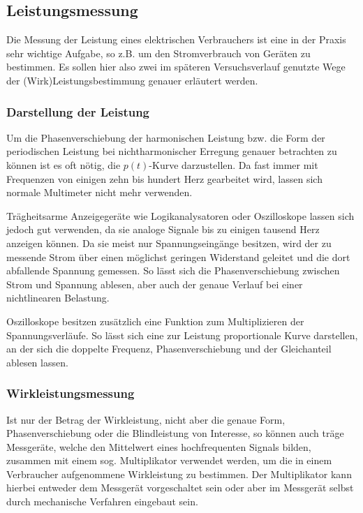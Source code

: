 \subsection{Leistungsmessung}
Die Messung der Leistung eines elektrischen Verbrauchers ist eine in der Praxis sehr wichtige Aufgabe, so z.B. um den Stromverbrauch von Geräten zu bestimmen. Es sollen hier also zwei im späteren Versuchsverlauf genutzte Wege der (Wirk)Leistungsbestimmung genauer erläutert werden.

\subsubsection{Darstellung der Leistung}
Um die Phasenverschiebung der harmonischen Leistung bzw. die Form der periodischen Leistung bei nichtharmonischer Erregung genauer betrachten zu können ist es oft nötig, die $p(t)$-Kurve darzustellen. Da fast immer mit Frequenzen von einigen zehn bis hundert Herz gearbeitet wird, lassen sich normale Multimeter nicht mehr verwenden.

Trägheitsarme Anzeigegeräte wie Logikanalysatoren oder Oszilloskope lassen sich jedoch gut verwenden, da sie analoge Signale bis zu einigen tausend Herz anzeigen können. Da sie meist nur Spannungseingänge besitzen, wird der zu messende Strom über einen möglichst geringen Widerstand geleitet und die dort abfallende Spannung gemessen. So lässt sich die Phasenverschiebung zwischen Strom und Spannung ablesen, aber auch der genaue Verlauf bei einer nichtlinearen Belastung.

Oszilloskope besitzen zusätzlich eine Funktion zum Multiplizieren der Spannungsverläufe. So lässt sich eine zur Leistung proportionale Kurve darstellen, an der sich die doppelte Frequenz, Phasenverschiebung und der Gleichanteil ablesen lassen.

\subsubsection{Wirkleistungsmessung}
Ist nur der Betrag der Wirkleistung, nicht aber die genaue Form, Phasenverschiebung oder die Blindleistung von Interesse, so können auch träge Messgeräte, welche den Mittelwert eines hochfrequenten Signals bilden, zusammen mit einem sog. Multiplikator verwendet werden, um die in einem Verbraucher aufgenommene Wirkleistung zu bestimmen. Der Multiplikator kann hierbei entweder dem Messgerät vorgeschaltet sein oder aber im Messgerät selbst durch mechanische Verfahren eingebaut sein.

